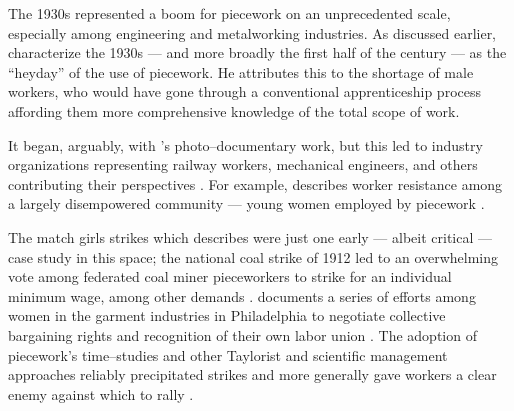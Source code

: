 \documentclass[trackingWork]{subfiles}
\begin{document}
The 1930s represented a boom for piecework on an unprecedented scale,
especially among engineering and metalworking industries.
As discussed earlier, \citeauthor{hart2013rise} characterize the 1930s
--- and more broadly the first half of the  century ---
as the ``heyday'' of the use of piecework.
He attributes this to the shortage of male workers,
who would have gone through a conventional apprenticeship process
affording them more comprehensive knowledge of the total scope of work.

It began, arguably, with \citeauthor{riisOtherSideLives}'s photo--documentary work,
but this led to industry organizations representing
railway workers, mechanical engineers, and others contributing their perspectives
\cite{american1921problem,richards1904anything,riisOtherSideLives}.
For example, \citeauthor{10.2307/3827491} describes worker resistance among a largely disempowered community --- young women employed by piecework
\cite{10.2307/3827491}.

The match girls strikes which \citeauthor{10.2307/3827491} describes were just one early
--- albeit critical ---
case study in this space;
the national coal strike of 1912 led to an overwhelming vote among federated coal miner pieceworkers
to strike for
an individual minimum wage, among other demands
\cite{10.2307/2221944}.
\citeauthor{10.2307/41829256} documents a series of efforts among women in the garment industries in Philadelphia to negotiate collective bargaining rights and recognition of their own labor union
\cite{10.2307/41829256}.
The adoption of piecework's time--studies and other Taylorist and scientific management approaches reliably precipitated strikes and more generally gave workers a clear enemy against which to rally
\cite{jacoby1983union}.
\end{document}
